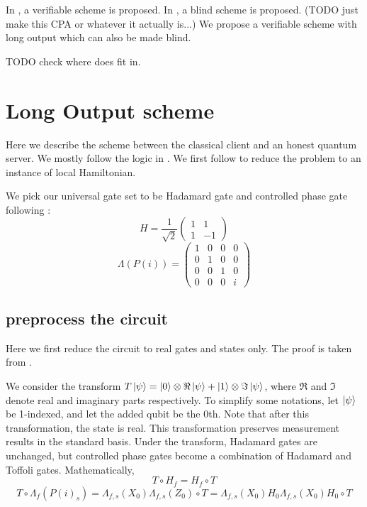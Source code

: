 \documentclass{article}
\theoremstyle{definition}
\begin{document}
In \cite{mahadev_delegation}, a verifiable scheme is proposed. In \cite{mahadev_qfhe}, a blind scheme is proposed. (TODO just make this CPA or whatever it actually is...) We propose a verifiable scheme with long output which can also be made blind.

TODO check where does \cite{1904.06320} fit in.

\section{Long Output scheme}

Here we describe the scheme between the classical client and an honest quantum server. We mostly follow the logic in \cite{mahadev_delegation}. We first follow \cite{kempe_kitaev_regev_2006} to reduce the problem to an instance of local Hamiltonian.

We pick our universal gate set to be Hadamard gate and controlled phase gate following \cite{quant-ph/0301040}:
$$H=\frac{1}{\sqrt{2}}\begin{pmatrix}1&1\\1&-1\end{pmatrix}$$
$$\Lambda(P(i))=\begin{pmatrix}1&0&0&0\\0&1&0&0\\0&0&1&0\\0&0&0&i\end{pmatrix}$$

\subsection{preprocess the circuit}

Here we first reduce the circuit to real gates and states only. The proof is taken from \cite{quant-ph/0301040}.

We consider the transform $T\ket{\psi}=\ket{0}\otimes\Re\ket{\psi}+\ket{1}\otimes\Im\ket{\psi}$, where $\Re$ and $\Im$ denote real and imaginary parts respectively. To simplify some notations, let $\ket{\psi}$ be 1-indexed, and let the added qubit be the 0th. Note that after this transformation, the state is real. This transformation preserves measurement results in the standard basis. Under the transform, Hadamard gates are unchanged, but controlled phase gates become a combination of Hadamard and Toffoli gates. Mathematically,
$$T\circ H_f=H_f\circ T$$
$$T\circ\Lambda_f(P(i)_s)=\Lambda_{f,s}(X_0)\Lambda_{f,s}(Z_0)\circ T=\Lambda_{f,s}(X_0)H_0\Lambda_{f,s}(X_0)H_0\circ T$$
\end{document}
